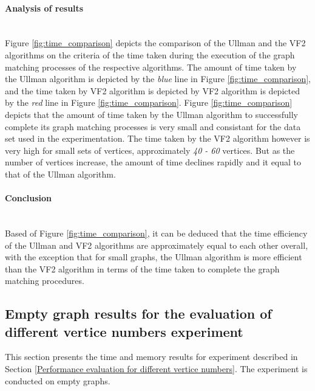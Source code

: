 \paragraph{Analysis of results}\mbox{}\\
Figure \ref{fig:time_comparison} depicts the comparison of the Ullman and the VF2 algorithms on the criteria of the time taken during the execution of the graph matching processes
of the respective algorithms.\newline\newline
The amount of time taken by the Ullman algorithm is depicted by the \textit{blue} line in Figure \ref{fig:time_comparison}, and the time taken by VF2 algorithm 
is depicted by VF2 algorithm is depicted by the \textit{red} line in Figure \ref{fig:time_comparison}.\newline\newline
Figure \ref{fig:time_comparison} depicts that the amount of time taken by the Ullman algorithm to successfully complete its graph matching processes is very 
small and consistant for the data set used in the experimentation.\newline\newline
The time taken by the VF2 algorithm however is very high for small sets of vertices, approximately \textit{40 - 60} vertices. But as the number of vertices 
increase, the amount of time declines rapidly and it equal to that of the Ullman algorithm.

\paragraph{Conclusion}\mbox{}\\
Based of Figure \ref{fig:time_comparison}, it can be deduced that the time efficiency of the Ullman and VF2 algorithms are approximately equal to each other overall,
with the exception that for small graphs, the Ullman algorithm is more efficient than the VF2 algorithm in terms of the time taken to complete the graph matching
procedures.

\subsection{Empty graph results for the evaluation of different vertice numbers experiment}
This section presents the time and memory results for experiment described in Section \ref{Performance evaluation for different vertice numbers}. The 
experiment is conducted on empty graphs.
